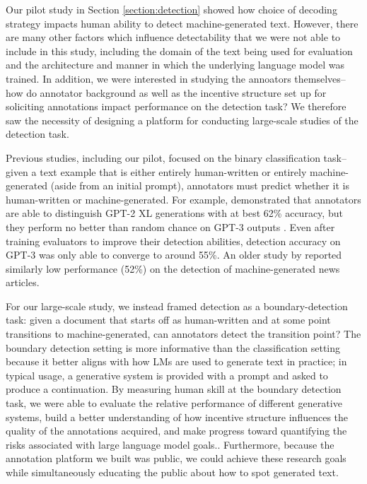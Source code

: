 Our pilot study in Section \ref{section:detection} showed how choice of decoding strategy impacts human ability to detect machine-generated text.
However, there are many other factors which influence detectability that we were not able to include in this study, including the domain of the text being used for evaluation and the architecture and manner in which the underlying language model was trained.
In addition, we were interested in studying the annoators themselves--how do annotator background as well as the incentive structure set up for soliciting annotations impact performance on the detection task?
We therefore saw the necessity of designing a platform for conducting large-scale studies of the detection task.

Previous studies, including our pilot, focused on the binary classification task--given a text example that is either entirely human-written or entirely machine-generated (aside from an initial prompt), annotators must predict whether it is human-written or machine-generated.
For example, \citet{clark2021all} demonstrated that annotators are able to distinguish GPT-2 XL generations with at best 62\% accuracy, but they perform no better than random chance on GPT-3 outputs \citep{brown2020language}.
Even after training evaluators to improve their detection abilities, detection accuracy on GPT-3 was only able to converge to around 55\%.
An older study by \citet{brown2020language} reported similarly low performance (52\%) on the detection of machine-generated news articles.

For our large-scale study, we instead framed detection as a boundary-detection task: given a document that starts off as human-written and at some point transitions to machine-generated, can annotators detect the transition point?
The boundary detection setting is more informative than the classification setting because it better aligns with how LMs are used to generate text in practice; in typical usage, a generative system is provided with a prompt and asked to produce a continuation.
By measuring human skill at the boundary detection task, we were able to evaluate the relative performance of different generative systems, build a better understanding of how incentive structure influences the quality of the annotations acquired, and make progress toward quantifying the risks associated with large language model goals..
Furthermore, because the annotation platform we built was public, we could achieve these research goals while simultaneously educating the public about how to spot generated text. 

